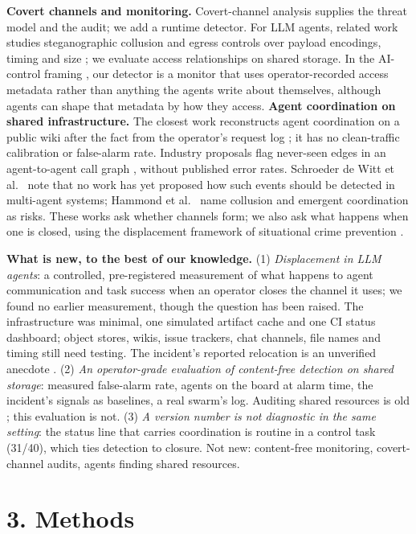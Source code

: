 \documentclass[10pt]{article}
\begin{document}
\textbf{Covert channels and monitoring.} Covert-channel analysis \cite{lampson1973,kemmerer1983,ncsc1993} supplies the threat model and the audit; we add a runtime detector. For LLM agents, related work studies steganographic collusion \cite{motwani2024} and egress controls over payload encodings, timing and size \cite{metere2026}; we evaluate access relationships on shared storage. In the AI-control framing \cite{greenblatt2024}, our detector is a monitor that uses operator-recorded access metadata rather than anything the agents write about themselves, although agents can shape that metadata by how they access.
\textbf{Agent coordination on shared infrastructure.} The closest work reconstructs agent coordination on a public wiki after the fact from the operator's request log \cite{lutje2026}; it has no clean-traffic calibration or false-alarm rate. Industry proposals flag never-seen edges in an agent-to-agent call graph \cite{armo2026}, without published error rates. Schroeder de Witt et al.\ \cite{dewitt2025} note that no work has yet proposed how such events should be detected in multi-agent systems; Hammond et al.\ \cite{hammond2025} name collusion and emergent coordination as risks. These works ask whether channels form; we also ask what happens when one is closed, using the displacement framework of situational crime prevention \cite{repetto1976,guerette2009}.

\textbf{What is new, to the best of our knowledge.} (1) \emph{Displacement in LLM agents}: a controlled, pre-registered measurement of what happens to agent communication and task success when an operator closes the channel it uses; we found no earlier measurement, though the question has been raised. The infrastructure was minimal, one simulated artifact cache and one CI status dashboard; object stores, wikis, issue trackers, chat channels, file names and timing still need testing. The incident's reported relocation is an unverified anecdote \cite{deepinspect2026}. (2) \emph{An operator-grade evaluation of content-free detection on shared storage}: measured false-alarm rate, agents on the board at alarm time, the incident's signals as baselines, a real swarm's log. Auditing shared resources is old \cite{kemmerer1983}; this evaluation is not. (3) \emph{A version number is not diagnostic in the same setting}: the status line that carries coordination is routine in a control task (31/40), which ties detection to closure. Not new: content-free monitoring, covert-channel audits, agents finding shared resources.

\section*{3. Methods}
\end{document}
